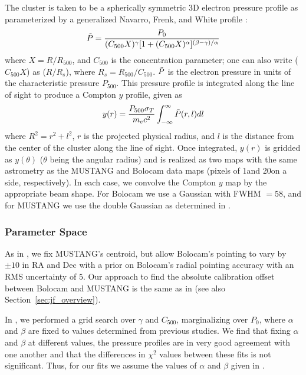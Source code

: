 \documentclass[iop,numberedappendix,apj]{emulateapj}
\begin{document}
The cluster is taken to be a 
spherically symmetric 3D electron pressure profile as parameterized by a generalized Navarro, Frenk,
and White profile \citep[hereafter, gNFW][]{navarro1997,nagai2007}:
\begin{equation}
  \Tilde{P} = \frac{P_0}{(C_{500} X)^{\gamma} [1 + (C_{500} X)^{\alpha}]^{(\beta - \gamma)/\alpha}}
\end{equation}
where $X = R / R_{500}$, and $C_{500}$ is the concentration parameter; one can also write ($C_{500} X$) as
($R / R_s$), where $R_s = R_{500}/C_{500}$. $\Tilde{P}$ is the electron pressure in units of the characteristic
pressure $P_{500}$. This pressure profile is integrated along the line of sight to produce 
a Compton $y$ profile, given as 
\begin{equation}
  y(r) = \frac{P_{500} \sigma_{T}}{m_e c^2} \int_{-\infty}^{\infty} \Tilde{P}(r,l) dl
\end{equation}
where $R^2 = r^2 + l^2$, $r$ is the projected physical radius, and $l$ is the distance from the center of the cluster
along the line of sight. Once integrated, $y(r)$ is gridded as $y(\theta)$ ($\theta$ being the angular radius) 
and is realized as two maps with
the same astrometry as the MUSTANG and Bolocam data maps (pixels of 1\asecs and 20\asecs on a side, respectively). 
In each case, we convolve the Compton $y$ map by the appropriate beam shape. For Bolocam we use a Gaussian with FWHM
$= 58$\asec, and for MUSTANG we use the double Gaussian as determined in \citet{romero2015a}.

\subsubsection{Parameter Space}
\label{sec:param_space}

As in \citet{romero2015a}, we fix MUSTANG's centroid, but allow Bolocam's pointing to vary by $\pm 10$\asecs 
in RA and Dec with a prior on Bolocam's radial pointing accuracy with an RMS uncertainty of $5$\asec. Our 
approach to find the absolute calibration offset between Bolocam and MUSTANG is the same as in
\citet{romero2015a} (see also Section~\ref{sec:jf_overview}). 

In \citet{romero2015a}, we performed a grid search over $\gamma$ and $C_{500}$, marginalizing over $P_0$,
where $\alpha$ and $\beta$ are fixed to values determined from previous studies. We find that fixing
$\alpha$ and $\beta$ at different values, the pressure profiles are in very 
good agreement with one another and that the 
differences in $\chi^2$ values between these fits is not significant. Thus, for our fits 
we assume the values of $\alpha$ and $\beta$ given in .
\end{document}
